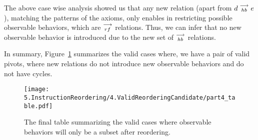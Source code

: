     The above case wise analysis showed us that any new relation (apart from $d\stackrel{\longrightarrow}{_{hb}}e$), matching the patterns of the axioms, only enables in restricting possible observable behaviors, which are $\stackrel{\longrightarrow}{_{rf}}$ relations. Thus, we can infer that no new observable behavior is introduced due to the new set of $\stackrel{\longrightarrow}{_{hb}}$ relations. 
    
    In summary, Figure~\ref{reord:final_table} summarizes the valid cases where, we have a pair of valid pivots, where new relations do not introduce new observable behaviors and do not have cycles. 
    \begin{figure}[H]
        \centering
        \texttt{[image: 5.InstructionReordering/4.ValidReorderingCandidate/part4\_table.pdf]}
        \caption{The final table summarizing the valid cases where observable behaviors will only be a subset after reordering.}
        \label{reord:final_table}
    \end{figure}
